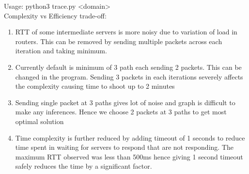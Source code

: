 \documentclass[]{assignment}
\begin{document}
    \pagebreak
    Usage: python3 trace.py <domain>
    \\
    Complexity vs Efficiency trade-off:
    \begin{enumerate}
        \item RTT of some intermediate servers is more noisy due to variation of load in routers. This can be removed by sending multiple packets across each iteration and taking minimum.
        \item Currently default is minimum of 3 path each sending 2 packets. This can be changed in the program. Sending 3 packets in each iterations severely affects the complexity causing time to shoot up to 2 minutes
        \item Sending single packet at 3 paths gives lot of noise and graph is difficult to make any inferences. Hence we choose 2 packets at 3 paths to get most optimal solution
        \item Time complexity is further reduced by adding timeout of 1 seconds to reduce time spent in waiting for servers to respond that are not responding. The maximum RTT observed was less than 500ms hence giving 1 second timeout safely reduces the time by a significant factor.
    \end{enumerate}
    

\listoffigures
\lstlistoflistings
\end{document}
